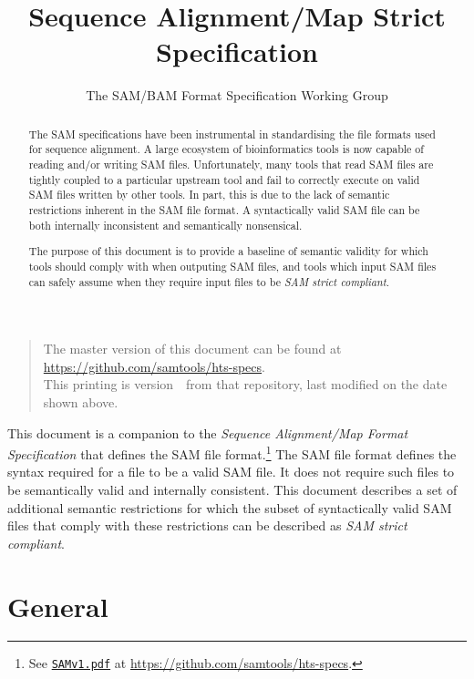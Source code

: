 \documentclass[10pt]{article}
\begin{document}

\title{Sequence Alignment/Map Strict Specification}
\author{The SAM/BAM Format Specification Working Group}
\date{\headdate}
\maketitle
\begin{quote}\small
The master version of this document can be found at
\url{https://github.com/samtools/hts-specs}.\\
This printing is version~\commitdesc\ from that repository,
last modified on the date shown above.
\end{quote}
\vspace*{1em}

\noindent
This document is a companion to the {\sl Sequence Alignment/Map Format
Specification} that defines the SAM file format.\footnote{See
\href{http://samtools.github.io/hts-specs/SAMv1.pdf}{\tt SAMv1.pdf} at \url{https://github.com/samtools/hts-specs}.}
The SAM file format defines the syntax required for a file to be
a valid SAM file. It does not require such files to be semantically
valid and internally consistent.
This document describes a set of additional semantic restrictions
for which the subset of syntactically valid SAM files that comply
with these restrictions can be described as \textit{SAM strict
compliant}.

\renewcommand{\abstractname}{Introduction}
\begin{abstract}

The SAM specifications have been instrumental in standardising
the file formats used for sequence alignment. A large ecosystem of
bioinformatics tools is now capable of reading and/or writing
SAM files. Unfortunately, many tools that read SAM files are tightly
coupled to a particular upstream tool 
and fail to correctly execute on valid SAM files written by other
tools. In part, this is due to the lack of semantic restrictions
inherent in the SAM file format. A syntactically valid SAM file
can be both internally inconsistent and semantically nonsensical.

The purpose of this document is to provide a baseline of semantic
validity for which tools should comply with when outputing SAM
files, and tools which input SAM files can safely assume when
they require input files to be \textit{SAM strict compliant}.

\end{abstract}

\section{General}
\end{document}
